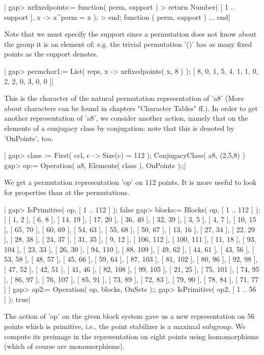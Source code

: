 |    gap> nrfixedpoints:= function( perm, support )
    > return Number( [ 1 .. support ], x -> x^perm = x );
    > end;
    function ( perm, support ) ... end|

Note that we must specify the support  since a permutation does not  know
about the group it is  an element of; e.g.  the trivial permutation  '()'
has as many fixed points as the support denotes.

|    gap> permchar1:= List( reps, x -> nrfixedpoints( x, 8 ) );
    [ 8, 0, 1, 5, 4, 1, 1, 0, 2, 2, 0, 3, 0, 0 ]|

This is the character of  the natural permutation  representation of 'a8'
(More about characters can  be found in chapters "Character Tables" ff.).
In order to  get  another representation  of 'a8',  we  consider  another
action, namely that on the elements of a conjugacy  class by conjugation;
note that this is denoted by 'OnPoints', too.

|    gap> class := First( ccl, c -> Size(c) = 112 );
    ConjugacyClass( a8, (2,5,8) )
    gap> op:= Operation( a8, Elements( class ), OnPoints );;|

We get a  permutation  representation 'op'  on 112 points.   It  is  more
useful to look for properties than at the permutations.

|    gap> IsPrimitive( op, [ 1 .. 112 ] );
    false
    gap> blocks:= Blocks( op, [ 1 .. 112 ] );
    [ [ 1, 2 ], [ 6, 8 ], [ 14, 19 ], [ 17, 20 ], [ 36, 40 ], [ 32, 39 ],
      [ 3, 5 ], [ 4, 7 ], [ 10, 15 ], [ 65, 70 ], [ 60, 69 ], [ 54, 63 ],
      [ 55, 68 ], [ 50, 67 ], [ 13, 16 ], [ 27, 34 ], [ 22, 29 ],
      [ 28, 38 ], [ 24, 37 ], [ 31, 35 ], [ 9, 12 ], [ 106, 112 ],
      [ 100, 111 ], [ 11, 18 ], [ 93, 104 ], [ 23, 33 ], [ 26, 30 ],
      [ 94, 110 ], [ 88, 109 ], [ 49, 62 ], [ 44, 61 ], [ 43, 56 ],
      [ 53, 58 ], [ 48, 57 ], [ 45, 66 ], [ 59, 64 ], [ 87, 103 ],
      [ 81, 102 ], [ 80, 96 ], [ 92, 98 ], [ 47, 52 ], [ 42, 51 ],
      [ 41, 46 ], [ 82, 108 ], [ 99, 105 ], [ 21, 25 ], [ 75, 101 ],
      [ 74, 95 ], [ 86, 97 ], [ 76, 107 ], [ 85, 91 ], [ 73, 89 ],
      [ 72, 83 ], [ 79, 90 ], [ 78, 84 ], [ 71, 77 ] ]
    gap> op2:= Operation( op, blocks, OnSets );;
    gap> IsPrimitive( op2, [ 1 .. 56 ] );
    true|

The action of 'op' on the given block system gave us a new representation
on 56 points which is primitive,  i.e., the point stabilizer is a maximal
subgroup.  We compute its preimage in  the representation on eight points
using homomorphisms (which of course are monomorphisms).

